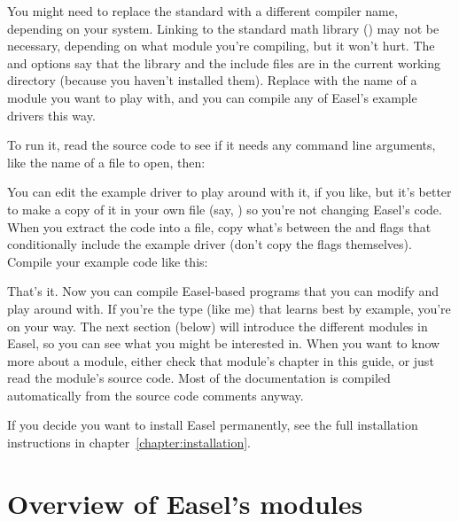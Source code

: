 \begin{cchunk}
\end{cchunk}

You might need to replace the standard  with a different
compiler name, depending on your system. Linking to the standard math
library () may not be necessary, depending on what module
you're compiling, but it won't hurt. The  and 
options say that the library and the include files are in the current
working directory (because you haven't installed them). Replace
 with the name of a module you want to play with, and you
can compile any of Easel's example drivers this way.

To run it, read the source code to see if it needs any command line
arguments, like the name of a file to open, then:

\begin{cchunk}
\end{cchunk}

You can edit the example driver to play around with it, if you like,
but it's better to make a copy of it in your own file (say,
) so you're not changing Easel's code. When you
extract the code into a file, copy what's between the  and  flags that
conditionally include the example driver (don't copy the flags
themselves).  Compile your example code like this:

\begin{cchunk}
\end{cchunk}

That's it. Now you can compile Easel-based programs that you can
modify and play around with. If you're the type (like me) that learns
best by example, you're on your way. The next section (below) will
introduce the different modules in Easel, so you can see what you
might be interested in. When you want to know more about a module,
either check that module's chapter in this guide, or just read the
module's source code. Most of the documentation is compiled
automatically from the source code comments anyway.

If you decide you want to install Easel permanently, see the full
installation instructions in chapter~\ref{chapter:installation}.

\section{Overview of Easel's modules}

